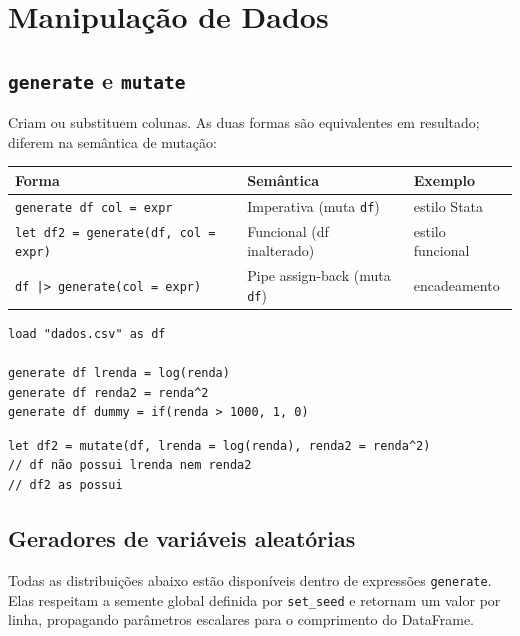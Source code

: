 \chapter{Manipulação de Dados}

\section{\texttt{generate} e \texttt{mutate}}

Criam ou substituem colunas. As duas formas são equivalentes em resultado; diferem
na semântica de mutação:

\begin{center}
\begin{tabular}{lll}
\toprule
\textbf{Forma} & \textbf{Semântica} & \textbf{Exemplo} \\
\midrule
\texttt{generate df col = expr}     & Imperativa (muta \texttt{df}) & estilo Stata \\
\texttt{let df2 = generate(df, col = expr)} & Funcional (df inalterado) & estilo funcional \\
\texttt{df |> generate(col = expr)} & Pipe assign-back (muta \texttt{df}) & encadeamento \\
\bottomrule
\end{tabular}
\end{center}

\begin{lstlisting}[caption={generate: forma imperativa}]
load "dados.csv" as df

generate df lrenda = log(renda)
generate df renda2 = renda^2
generate df dummy = if(renda > 1000, 1, 0)
\end{lstlisting}

\begin{lstlisting}[caption={mutate: forma funcional}]
let df2 = mutate(df, lrenda = log(renda), renda2 = renda^2)
// df não possui lrenda nem renda2
// df2 as possui
\end{lstlisting}

\section{Geradores de variáveis aleatórias}

Todas as distribuições abaixo estão disponíveis dentro de expressões
\lstinline{generate}. Elas respeitam a semente global definida por
\lstinline{set_seed} e retornam um valor por linha, propagando parâmetros
escalares para o comprimento do DataFrame.

